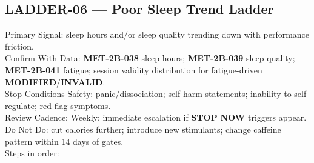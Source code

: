 \documentclass[10pt]{article}
\begin{document}
\newpage

\subsection*{LADDER-06 — Poor Sleep Trend Ladder}
{}

Primary Signal: sleep hours and/or sleep quality trending down with performance friction.\\
Confirm With Data: \textbf{MET-2B-038} sleep hours; \textbf{MET-2B-039} sleep quality; \textbf{MET-2B-041} fatigue; session validity distribution for fatigue-driven \textbf{MODIFIED}/\textbf{INVALID}.\\
Stop Conditions Safety: panic/dissociation; self-harm statements; inability to self-regulate; red-flag symptoms.\\
Review Cadence: Weekly; immediate escalation if \textbf{STOP} \textbf{NOW} triggers appear.\\
Do Not Do: cut calories further; introduce new stimulants; change caffeine pattern within 14 days of gates.\\
Steps in order:
\end{document}
